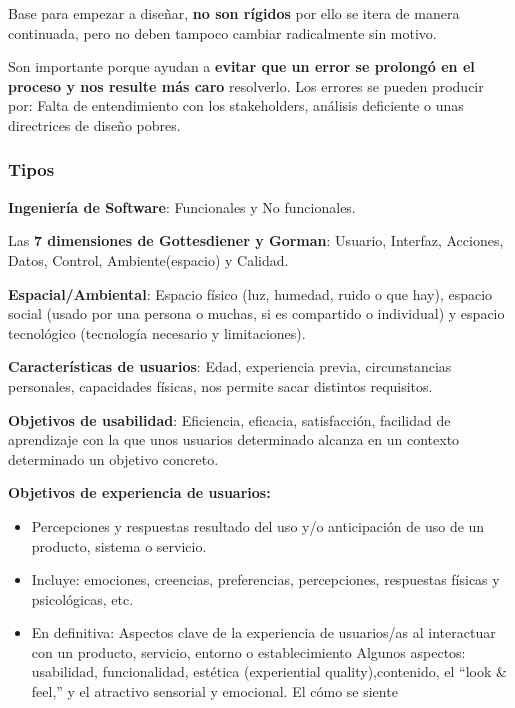Base para empezar a diseñar, \textbf{no son rígidos} por ello se itera
de manera continuada, pero no deben tampoco cambiar radicalmente sin
motivo.

Son importante porque ayudan a \textbf{evitar que un error se prolongó
en el proceso y nos resulte más caro} resolverlo. Los errores se pueden
producir por: Falta de entendimiento con los stakeholders, análisis
deficiente o unas directrices de diseño pobres.

\hypertarget{tipos}{%
\subsubsection{Tipos}\label{tipos}}

\textbf{Ingeniería de Software}: Funcionales y No funcionales.

Las \textbf{7 dimensiones de Gottesdiener y Gorman}: Usuario, Interfaz,
Acciones, Datos, Control, Ambiente(espacio) y Calidad.

\textbf{Espacial/Ambiental}: Espacio físico (luz, humedad, ruido o que
hay), espacio social (usado por una persona o muchas, si es compartido o
individual) y espacio tecnológico (tecnología necesario y limitaciones).

\textbf{Características de usuarios}: Edad, experiencia previa,
circunstancias personales, capacidades físicas, nos permite sacar
distintos requisitos.

\textbf{Objetivos de usabilidad}: Eficiencia, eficacia, satisfacción,
facilidad de aprendizaje con la que unos usuarios determinado alcanza en
un contexto determinado un objetivo concreto.

\textbf{Objetivos de experiencia de usuarios:}

\begin{itemize}
\tightlist
\item
  Percepciones y respuestas resultado del uso y/o anticipación de uso de
  un producto, sistema o servicio.
\item
  Incluye: emociones, creencias, preferencias, percepciones, respuestas
  físicas y psicológicas, etc.
\item
  En definitiva: Aspectos clave de la experiencia de usuarios/as al
  interactuar con un producto, servicio, entorno o establecimiento
  Algunos aspectos: usabilidad, funcionalidad, estética (experiential
  quality),contenido, el ``look \& feel,'' y el atractivo sensorial y
  emocional. El cómo se siente
\end{itemize}

